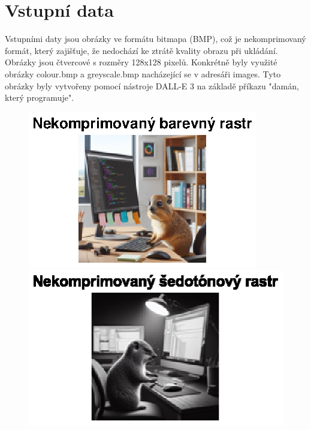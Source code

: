\newpage
\section*{Vstupní data}

Vstupními daty jsou obrázky ve formátu bitmapa (BMP), což je nekomprimovaný formát, který zajišťuje, že nedochází ke ztrátě kvality obrazu při ukládání. Obrázky jsou čtvercové s rozměry 128x128 pixelů. Konkrétně byly využité obrázky colour.bmp a greyscale.bmp nacházející se v adresáři images. Tyto obrázky byly vytvořeny pomocí nástroje DALL-E 3 na základě příkazu "damán, který programuje".

\begin{figure}[H]
    \centering
    \begin{minipage}[b]{0.45\textwidth}
        \centering
        \includegraphics[width=\textwidth]{images/color.eps}
    \end{minipage}
    \hfill
    \begin{minipage}[b]{0.45\textwidth}
        \centering
        \includegraphics[width=\textwidth]{images/grey.eps}
    \end{minipage}
\end{figure}